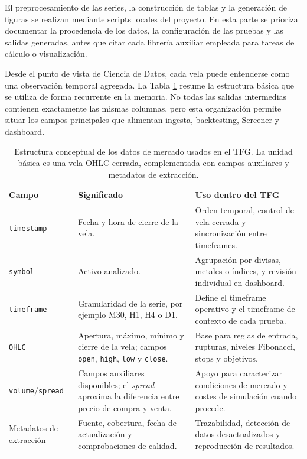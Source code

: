 El preprocesamiento de las series, la construcci\'on de tablas y la generaci\'on
de figuras se realizan mediante scripts locales del proyecto. En esta parte se
prioriza documentar la procedencia de los datos, la configuraci\'on de las
pruebas y las salidas generadas, antes que citar cada librer\'ia auxiliar
empleada para tareas de c\'alculo o visualizaci\'on.

Desde el punto de vista de Ciencia de Datos, cada vela puede entenderse como
una observaci\'on temporal agregada. La Tabla \ref{tab:estructura-datos-ohlc}
resume la estructura b\'asica que se utiliza de forma recurrente en la memoria.
No todas las salidas intermedias contienen exactamente las mismas columnas,
pero esta organizaci\'on permite situar los campos principales que alimentan
ingesta, backtesting, Screener y dashboard.

\begin{table}[H]
\centering
\small
\begin{tabular}{p{} p{} p{}}
\hline
\textbf{Campo} & \textbf{Significado} & \textbf{Uso dentro del TFG} \\
\hline
\texttt{timestamp} & Fecha y hora de cierre de la vela. & Orden temporal, control de vela cerrada y sincronizaci\'on entre timeframes. \\
\texttt{symbol} & Activo analizado. & Agrupaci\'on por divisas, metales o \'indices, y revisi\'on individual en dashboard. \\
\texttt{timeframe} & Granularidad de la serie, por ejemplo M30, H1, H4 o D1. & Define el timeframe operativo y el timeframe de contexto de cada prueba. \\
\texttt{OHLC} & Apertura, m\'aximo, m\'inimo y cierre de la vela; campos \texttt{open}, \texttt{high}, \texttt{low} y \texttt{close}. & Base para reglas de entrada, rupturas, niveles Fibonacci, stops y objetivos. \\
\texttt{volume}/\texttt{spread} & Campos auxiliares disponibles; el \textit{spread} aproxima la diferencia entre precio de compra y venta. & Apoyo para caracterizar condiciones de mercado y costes de simulaci\'on cuando procede. \\
Metadatos de extracci\'on & Fuente, cobertura, fecha de actualizaci\'on y comprobaciones de calidad. & Trazabilidad, detecci\'on de datos desactualizados y reproducci\'on de resultados. \\
\hline
\end{tabular}
\caption[Estructura conceptual de datos OHLC]{Estructura conceptual de los datos de mercado usados en el TFG. La unidad
b\'asica es una vela OHLC cerrada, complementada con campos auxiliares y
metadatos de extracci\'on.}
\label{tab:estructura-datos-ohlc}
\end{table}

